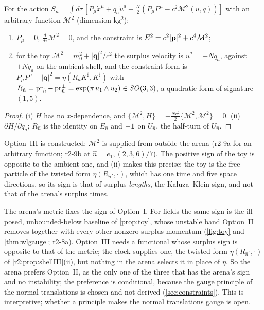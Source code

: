 \begin{proposition}
\label{r2:prop:shellIII}
For the action $S_{\hat n}=\int d\tau\,[P_\mu\dot x^\mu+q_a\dot u^a-\tfrac N2(P_\mu P^\mu-c^2\mathcal M^2(u,q))]$ with an arbitrary
function $\mathcal M^2$ (dimension $\mathrm{kg^2}$):
\begin{enumerate}[label=(\roman*),leftmargin=2.2em]
\item $\dot P_\mu=0$, $\tfrac{d}{d\tau}\mathcal M^2=0$, and the constraint is $E^2=c^2|\mathbf p|^2+c^4\mathcal M^2$;
\item for the toy $\mathcal M^2=m_0^2+|\mathbf q|^2/c^2$ the surplus velocity is $\dot u^a=-Nq_a$, against $+Nq_a$ on the ambient shell, and the constraint
form is $P_\mu P^\mu-|\mathbf q|^2=\eta(R_{\hat n}K^\sharp,K^\sharp)$ with $R_{\hat n}=\operatorname{pr}_{\hat n}-\operatorname{pr}^{\perp}_{\hat n}=\exp(\pi\,u_1\wedge u_2)\in SO(3,3)$, a quadratic form of
signature $(1,5)$.
\end{enumerate}
\end{proposition}

\begin{proof}
(i) $H$ has no $x$-dependence, and $\{\mathcal M^2,H\}=-\tfrac{Nc^2}2\{\mathcal M^2,\mathcal M^2\}=0$. (ii) $\partial H/\partial q_a$; $R_{\hat n}$ is the
identity on $E_{\hat n}$ and $-\mathbf 1$ on $U_{\hat n}$, the half-turn of $U_{\hat n}$.
\end{proof}

Option~III is constructed: $\mathcal M^2$ is supplied from outside the arena (r2-9a for an arbitrary
function; r2-9b at $\hat n=e_1,(2,3,6)/7$). The positive sign of the toy is opposite to the ambient one, and (ii) makes this precise: the toy is the free particle of the twisted form $\eta(R_{\hat n}\cdot,\cdot)$, which has one time and five space directions, so its sign is
that of surplus \emph{lengths}, the Kaluza--Klein sign, and not that of the arena's surplus times.

\begin{remark}
\label{r2:rem:prefer}
The arena's metric fixes the sign of Option~I. For fields the same sign is the ill-posed, unbounded-below baseline of \cref{prop:toy}, whose
unstable band Option~II removes together with every other nonzero surplus momentum (\cref{fig:toy} and \cref{thm:wlgauge}; r2-8a). Option~III needs a
functional whose surplus sign is opposite to that of the metric; the clock supplies one, the twisted form $\eta(R_{\hat n}\cdot,\cdot)$ of
\cref{r2:prop:shellIII}(ii), but nothing in the arena selects it in place of $\eta$. So the arena prefers Option~II, as the only one of the three that has the arena's sign and no
instability; the preference is conditional, because the gauge principle of the normal translations is chosen and not derived (\cref{sec:constraints}). This is interpretive; whether a principle makes the normal translations gauge is open.
\end{remark}

